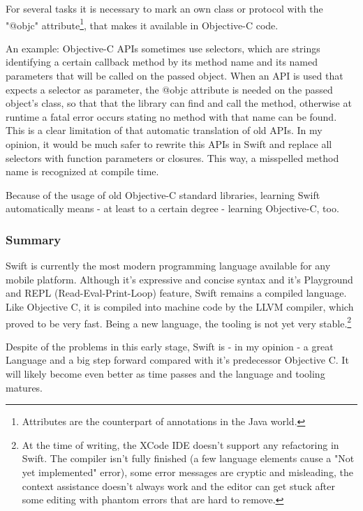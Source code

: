 For several tasks it is necessary to mark an own class or protocol with the "@objc" attribute\footnote{Attributes are the counterpart of annotations in the Java world.}, that makes it available in Objective-C code. 

An example: Objective-C APIs sometimes use selectors, which are strings identifying a certain callback method by its method name and its named parameters that will be called on the passed object.
When an API is used that expects a selector as parameter, the @objc attribute is needed on the passed object's class, so that that the library can find and call the method, otherwise at runtime a fatal error occurs stating no method with that name can be found.
This is a clear limitation of that automatic translation of old APIs. In my opinion, it would be much safer to rewrite this APIs in Swift and replace all selectors with function parameters or closures. This way, a misspelled method name is recognized at compile time.

Because of the usage of old Objective-C standard libraries, learning Swift automatically means - at least to a certain degree - learning Objective-C, too. 

\subsubsection{Summary}

Swift is currently the most modern programming language available for any mobile platform. Although it's expressive and concise syntax and it's Playground and REPL (Read-Eval-Print-Loop) feature, Swift remains a compiled language. Like Objective C, it is compiled into machine code by the LLVM compiler, which proved to be very fast. Being a new language, the tooling is not yet very stable.\footnote{At the time of writing, the XCode IDE doesn't support any refactoring in Swift. The compiler isn't fully finished (a few language elements cause a "Not yet implemented" error), some error messages are cryptic and misleading, the context assistance doesn't always work and the editor can get stuck after some editing with phantom errors that are hard to remove.}

Despite of the problems in this early stage, Swift is - in my opinion - a great Language and a big step forward compared with it's predecessor Objective C. It will likely become even better as time passes and the language and tooling matures. 



